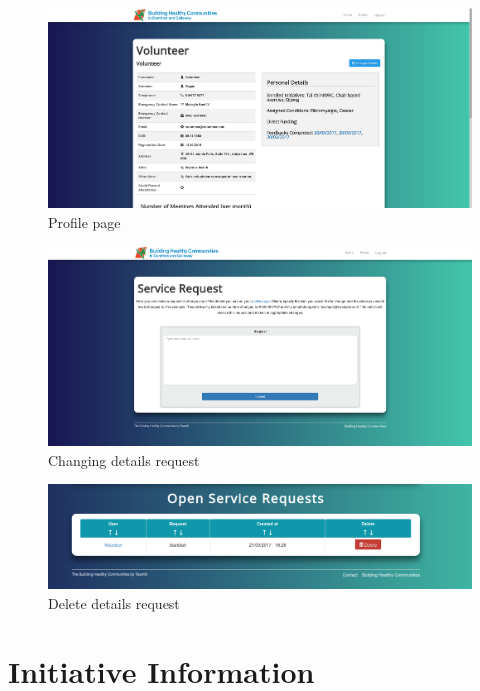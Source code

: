 \documentclass{bhcguides}
\begin{document}
\begin{figure}[h]
 \centerline{\includegraphics[width=\textwidth, height=\textheight, keepaspectratio]{profilepage.png}}
 \caption{Profile page}
 \label{fig:profilePage}
\end{figure}

\begin{figure}[h]
 \centerline{\includegraphics[width=\textwidth, height=\textheight, keepaspectratio]{detailchange.png}}
 \caption{Changing details request}
 \label{fig:detailChange}
\end{figure}

\begin{figure}[h]
 \centerline{\includegraphics[width=\textwidth, height=\textheight, keepaspectratio]{deleteRequest.png}}
 \caption{Delete details request}
 \label{fig:detailDelete}
\end{figure}

\pagebreak

\section{Initiative Information}
\label{sec:initiatives}
\end{document}
